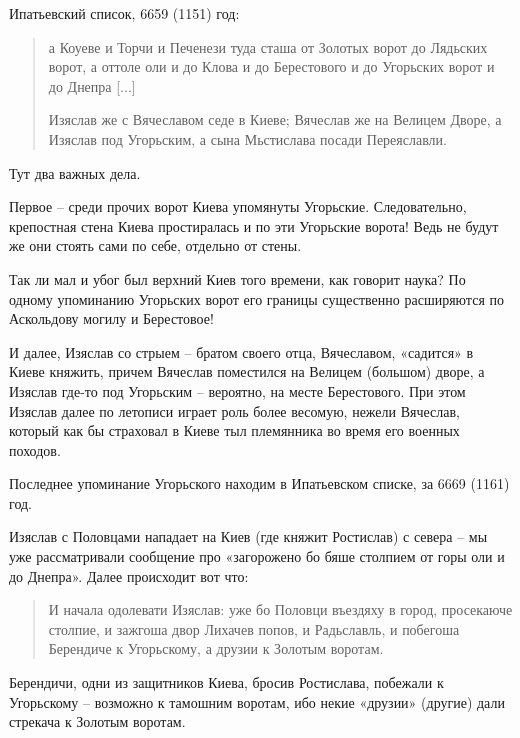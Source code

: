 


Ипатьевский список, 6659 (1151) год:

\begin{quotation}
а Коуеве и Торчи и Печенези туда сташа от Золотых ворот до Лядьских ворот, а оттоле оли и до Клова и до Берестового и до Угорьских ворот и до Днепра [...]

Изяслав же с Вячеславом седе в Киеве; Вячеслав же на Велицем Дворе, а Изяслав под Угорьским, а сына Мьстислава посади Переяславли.
\end{quotation}

Тут два важных дела. 

Первое – среди прочих ворот Киева упомянуты Угорьские. Следовательно, крепостная стена Киева простиралась и по эти Угорьские ворота! Ведь не будут же они стоять сами по себе, отдельно от стены.

Так ли мал и убог был верхний Киев того времени, как говорит наука? По одному упоминанию Угорьских ворот его границы существенно расширяются по Аскольдову могилу и Берестовое!

И далее, Изяслав со стрыем – братом своего отца, Вячеславом, «садится» в Киеве княжить, причем Вячеслав поместился на Велицем (большом) дворе, а Изяслав где-то под Угорьским – вероятно, на месте Берестового. При этом Изяслав далее по летописи играет роль более весомую, нежели Вячеслав, который как бы страховал в Киеве тыл племянника во время его военных походов.

Последнее упоминание Угорьского находим в Ипатьевском списке, за 6669 (1161) год. 

Изяслав с Половцами нападает на Киев (где княжит Ростислав) с севера – мы уже рассматривали сообщение про «загорожено бо бяше столпием от горы оли и до Днепра». Далее происходит вот что:

\begin{quotation}
И начала одолевати Изяслав: уже бо Половци въездяху в город, просекаюче столпие, и зажгоша двор Лихачев попов, и Радьславль, и побегоша Берендиче к Угорьскому, а друзии к Золотым воротам.
\end{quotation}

Берендичи, одни из защитников Киева, бросив Ростислава, побежали к Угорьскому – возможно к тамошним воротам, ибо некие «друзии» (другие) дали стрекача к Золотым воротам.

